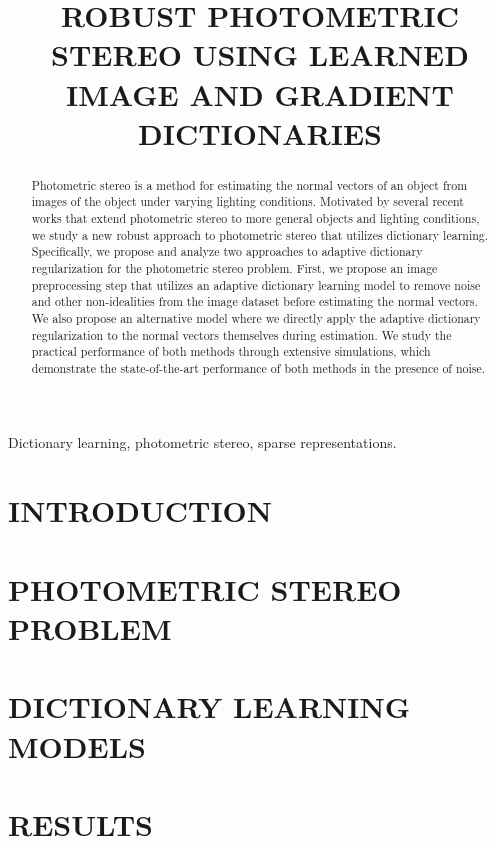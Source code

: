 \documentclass[9pt]{article}
\title{ROBUST PHOTOMETRIC STEREO USING LEARNED IMAGE AND GRADIENT DICTIONARIES}
\begin{document}

\maketitle

\begin{abstract}
Photometric stereo is a method for estimating the normal vectors of an object from images of the object under varying lighting conditions. Motivated by several recent works that extend photometric stereo to more general objects and lighting conditions, we study a new robust approach to photometric stereo that utilizes dictionary learning. Specifically, we propose and analyze two approaches to adaptive dictionary regularization for the photometric stereo problem. First, we propose an image preprocessing step that utilizes an adaptive dictionary learning model to remove noise and other non-idealities from the image dataset before estimating the normal vectors. We also propose an alternative model where we directly apply the adaptive dictionary regularization to the normal vectors themselves during estimation. We study the practical performance of both methods through extensive simulations, which demonstrate the state-of-the-art performance of both methods in the presence of noise.
\end{abstract}

\begin{keywords}
Dictionary learning, photometric stereo, sparse representations.
\end{keywords}

\section{INTRODUCTION} \label{sec:intro}


\section{PHOTOMETRIC STEREO PROBLEM} \label{sec:prelims}



\section{DICTIONARY LEARNING MODELS} \label{sec:dl}


\section{RESULTS} \label{sec:examples}

\end{document}
